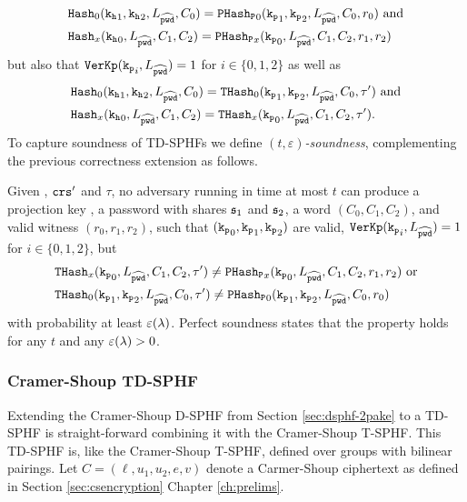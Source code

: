 \begin{align*}  
&\mathtt{Hash}_0(\mathtt{k_h}_1, \mathtt{k_h}_2, L_{\widehat{\mathtt{pwd}}}, C_0)=\mathtt{PHash_P}_0(\mathtt{k_p}_1, \mathtt{k_p}_2, L_{\widehat{\mathtt{pwd}}}, C_0, r_0) \text{ and} \\
&\mathtt{Hash}_x(\mathtt{k_h}_0, L_{\widehat{\mathtt{pwd}}}, C_1, C_2)=\mathtt{PHash_P}_x(\mathtt{k_p}_0, L_{\widehat{\mathtt{pwd}}}, C_1, C_2, r_1, r_2)
\end{align*}
but also that $\mathtt{VerKp}(\mathtt{k_p}_i, L_{\widehat{\mathtt{pwd}}})=1$ for $i\in\{0,1,2\}$ as well as 
\begin{align*}
&\mathtt{Hash}_0(\mathtt{k_h}_1, \mathtt{k_h}_2, L_{\widehat{\mathtt{pwd}}}, C_0)=\mathtt{THash}_0(\mathtt{k_p}_1, \mathtt{k_p}_2, L_{\widehat{\mathtt{pwd}}}, C_0, \tau') \text{ and} \\
&\mathtt{Hash}_x(\mathtt{k_h}_0, L_{\widehat{\mathtt{pwd}}}, C_1, C_2)=\mathtt{THash}_x(\mathtt{k_p}_0, L_{\widehat{\mathtt{pwd}}}, C_1, C_2, \tau').
\end{align*}
To capture soundness of TD-SPHFs we define \emph{$(t,\varepsilon)$-soundness}, complementing the previous correctness extension as follows.

\begin{definition}\label{def:tdsphf-soundness}
Given \crs, $\mathtt{crs}'$ and $\tau$, no adversary running in time at most $t$ can produce a projection key \hp, a password \pwd with shares $\mathfrak{s}_1$ and $\mathfrak{s}_2$, a word $(C_0,C_1,C_2)$, and valid witness $(r_0,r_1,r_2)$, such that $(\mathtt{k_p}_0,\mathtt{k_p}_1,\mathtt{k_p}_2)$ are valid, \ie $\mathtt{VerKp}(\mathtt{k_p}_i,L_{\widehat{\mathtt{pwd}}})=1$ for $i\in\{0,1,2\}$, but 
\begin{align*}
&\mathtt{THash}_x(\mathtt{k_p}_0,L_{\widehat{\mathtt{pwd}}},C_1, C_2, \tau')\not=\mathtt{PHash_P}_x(\mathtt{k_p}_0,L_{\widehat{\mathtt{pwd}}}, C_1, C_2, r_1, r_2) \text{ or} \\
&\mathtt{THash}_0(\mathtt{k_p}_1, \mathtt{k_p}_2, L_{\widehat{\mathtt{pwd}}}, C_0, \tau')\not=\mathtt{PHash_P}_0(\mathtt{k_p}_1, \mathtt{k_p}_2, L_{\widehat{\mathtt{pwd}}}, C_0, r_0)
\end{align*}
with probability at least $\varepsilon(\lambda)$.
Perfect soundness states that the property holds for any $t$ and any $\varepsilon(\lambda)>0$.
\end{definition} 

\subsubsection{Cramer-Shoup TD-SPHF}\label{sec:cs-tdsphf}
Extending the Cramer-Shoup \ac{D-SPHF} from Section \ref{sec:dsphf-2pake} to a \ac{TD-SPHF} is straight-forward combining it with the Cramer-Shoup \ac{T-SPHF}.
This \ac{TD-SPHF} is, like the Cramer-Shoup \ac{T-SPHF}, defined over groups with bilinear pairings.
Let $C=(\ell, u_1, u_2, e, v)$ denote a Carmer-Shoup ciphertext as defined in Section \ref{sec:csencryption} Chapter \ref{ch:prelims}.

